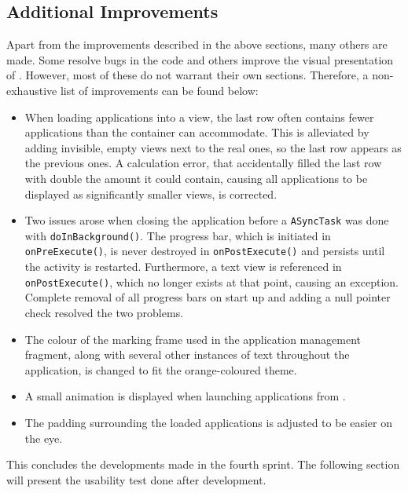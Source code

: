 \subsection{Additional Improvements}

Apart from the improvements described in the above sections, many others are made.
Some resolve bugs in the code and others improve the visual presentation of \launcher.
However, most of these do not warrant their own sections.
Therefore, a non-exhaustive list of improvements can be found below:

\begin{itemize}
\item When loading applications into a view, the last row often contains fewer applications than the container can accommodate.
This is alleviated by adding invisible, empty views next to the real ones, so the last row appears as the previous ones.
A calculation error, that accidentally filled the last row with double the amount it could contain, causing all applications to be displayed as significantly smaller views, is corrected.
\item Two issues arose when closing the application before a \lstinline|ASyncTask| was done with \lstinline|doInBackground()|.
The progress bar, which is initiated in \lstinline|onPreExecute()|, is never destroyed in \lstinline|onPostExecute()| and persists until the activity is restarted.
Furthermore, a text view is referenced in \lstinline|onPostExecute()|, which no longer exists at that point, causing an exception.
Complete removal of all progress bars on start up and adding a null pointer check resolved the two problems.
\item The colour of the marking frame used in the application management fragment, along with several other instances of text throughout the application, is changed to fit the orange-coloured theme.
\item A small animation is displayed when launching applications from \homeactivity.
\item The padding surrounding the loaded applications is adjusted to be easier on the eye.
\end{itemize}

This concludes the developments made in the fourth sprint.
The following section will present the usability test done after development.